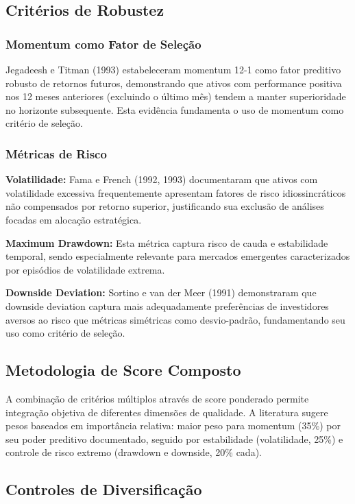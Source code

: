 \subsection{Critérios de Robustez}

\subsubsection{Momentum como Fator de Seleção}

Jegadeesh e Titman (1993) estabeleceram momentum 12-1 como fator preditivo robusto de retornos futuros, demonstrando que ativos com performance positiva nos 12 meses anteriores (excluindo o último mês) tendem a manter superioridade no horizonte subsequente. Esta evidência fundamenta o uso de momentum como critério de seleção.

\subsubsection{Métricas de Risco}

\textbf{Volatilidade:} Fama e French (1992, 1993) documentaram que ativos com volatilidade excessiva frequentemente apresentam fatores de risco idiossincráticos não compensados por retorno superior, justificando sua exclusão de análises focadas em alocação estratégica.

\textbf{Maximum Drawdown:} Esta métrica captura risco de cauda e estabilidade temporal, sendo especialmente relevante para mercados emergentes caracterizados por episódios de volatilidade extrema.

\textbf{Downside Deviation:} Sortino e van der Meer (1991) demonstraram que downside deviation captura mais adequadamente preferências de investidores aversos ao risco que métricas simétricas como desvio-padrão, fundamentando seu uso como critério de seleção.

\subsection{Metodologia de Score Composto}

A combinação de critérios múltiplos através de score ponderado permite integração objetiva de diferentes dimensões de qualidade. A literatura sugere pesos baseados em importância relativa: maior peso para momentum (35\%) por seu poder preditivo documentado, seguido por estabilidade (volatilidade, 25\%) e controle de risco extremo (drawdown e downside, 20\% cada).

\subsection{Controles de Diversificação}

